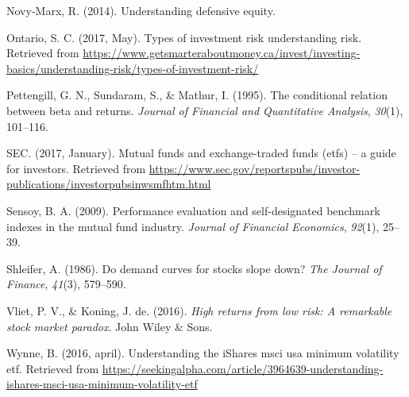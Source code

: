 \documentclass[12pt,twoside]{reedthesis}
\theoremstyle{definition}
\theoremstyle{definition}
\theoremstyle{definition}
\theoremstyle{remark}
\begin{document}
\hypertarget{ref-novy2014}{}
Novy-Marx, R. (2014). Understanding defensive equity.

\hypertarget{ref-ontario2017}{}
Ontario, S. C. (2017, May). Types of investment risk \textbar{}
understanding risk. Retrieved from
\url{https://www.getsmarteraboutmoney.ca/invest/investing-basics/understanding-risk/types-of-investment-risk/}

\hypertarget{ref-pettengill1995}{}
Pettengill, G. N., Sundaram, S., \& Mathur, I. (1995). The conditional
relation between beta and returns. \emph{Journal of Financial and
Quantitative Analysis}, \emph{30}(1), 101--116.

\hypertarget{ref-sec2017}{}
SEC. (2017, January). Mutual funds and exchange-traded funds (etfs) -- a
guide for investors. Retrieved from
\url{https://www.sec.gov/reportspubs/investor-publications/investorpubsinwsmfhtm.html}

\hypertarget{ref-sensoy2009}{}
Sensoy, B. A. (2009). Performance evaluation and self-designated
benchmark indexes in the mutual fund industry. \emph{Journal of
Financial Economics}, \emph{92}(1), 25--39.

\hypertarget{ref-shleifer1986}{}
Shleifer, A. (1986). Do demand curves for stocks slope down? \emph{The
Journal of Finance}, \emph{41}(3), 579--590.

\hypertarget{ref-van2016}{}
Vliet, P. V., \& Koning, J. de. (2016). \emph{High returns from low
risk: A remarkable stock market paradox}. John Wiley \& Sons.

\hypertarget{ref-wynne2016}{}
Wynne, B. (2016, april). Understanding the iShares msci usa minimum
volatility etf. Retrieved from
\url{https://seekingalpha.com/article/3964639-understanding-ishares-msci-usa-minimum-volatility-etf}


\end{document}
